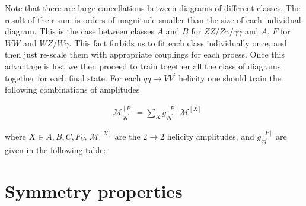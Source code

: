 \documentclass[aps,prl,twocolumn,superscriptaddress,amsfont,graphicx,preprintnumbers]{revtex4-1}
\newcommand{\mcM}{\mathcal{M}}
\newcommand{\red}[1]{{\color{Red}{#1}}}
\begin{document}

Note that there are large cancellations between diagrams of different classes. The result of their sum is orders of magnitude smaller than the size of each individual diagram. This is the case between classes $A$ and $B$ for $ZZ/Z\gamma/\gamma\gamma$ and  $A$, $F$ \red{(or $B,F$)} for $WW$ and $WZ/W\gamma$. This fact forbids us to fit each class individually once, and then just re-scale them with appropriate couplings for each proess. Once this advantage is lost we then proceed to train together all the class of diagrams together for each final state. For each $qq \to VV^\prime$ helicity one should train the following combinations of amplitudes
\medskip

\begin{equation}
    \begin{aligned}
    &\mcM^{[P]}_{qq^\prime} = \sum_X g^{[P]}_{qq^\prime} \, \mcM^{[X]}
    \end{aligned}
\end{equation}

where $X \in {A,B,C,F_V}$, $\mcM^{[X]}$ are the $2 \to 2$ helicity amplitudes, and $g^{[P]}_{qq^\prime}$ are given in the following table:








\section{Symmetry properties}
\end{document}
